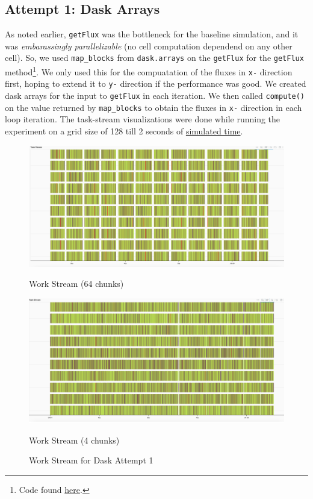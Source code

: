\documentclass[a4paper,10pt]{article}
\begin{document}
\subsection{Attempt 1: Dask Arrays}
As noted earlier, \verb|getFlux| was the bottleneck for the baseline simulation, and it was \textit{embarassingly parallelizable} (no cell computation dependend on any other cell).
So, we used \verb|map_blocks| from \verb|dask.arrays| on the \verb|getFlux| for the \verb|getFlux| method\footnote{Code found \href{https://github.com/paulmyr/DD2358-HPC25/blob/master/10_project_rishi_paul/code/dask/finitevolume_dask_opt1.py}{here}.}.
We only used this for the compuatation of the fluxes in \verb|x-| direction first, hoping to extend it to \verb|y-| direction if the performance was good.
We created dask arrays for the input to \verb|getFlux| in each iteration.
We then called \verb|compute()| on the value returned by \verb|map_blocks| to obtain the fluxes in \verb|x-| direction in each loop iteration.
The task-stream visualizations were done while running the experiment on a grid size of 128 till 2 seconds of \underline{simulated time}.
\begin{figure}[h!]
   \begin{minipage}{0.5\textwidth}
       \centering
       \includegraphics[width=\linewidth]{images/dask/dask_opt1_n_by_8.png}
      \caption{Work Stream (64 chunks)}
       \label{fig:dask_opt1_stream_64}
   \end{minipage}
   \hspace{0.1cm}
   \begin{minipage}{0.5\textwidth}
       \centering
       \includegraphics[width=\linewidth]{images/dask/dask_opt1_n_by_2.png}
      \caption{Work Stream (4 chunks)}
      \label{fig:dask_opt1_stream_4}
  \end{minipage}
  \caption{Work Stream for Dask Attempt 1}
  \label{fig:dask_opt1_stream}
\end{figure}
\end{document}
